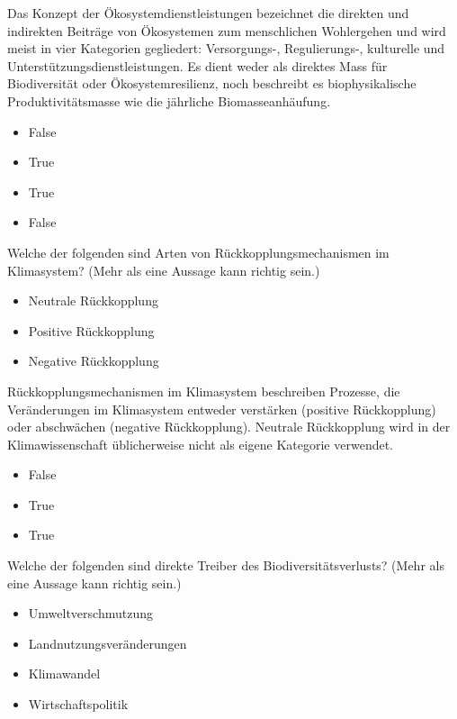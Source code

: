 \documentclass[
  nswissgerman,
  a4paper,
  DIV=11,
  numbers=noendperiod,
  oneside,
  openany]{scrreprt}
\providecommand{\tightlist}{%
  \setlength{\itemsep}{0pt}\setlength{\parskip}{0pt}}
\begin{document}
Das Konzept der Ökosystemdienstleistungen bezeichnet die direkten und
indirekten Beiträge von Ökosystemen zum menschlichen Wohlergehen und
wird meist in vier Kategorien gegliedert: Versorgungs-, Regulierungs-,
kulturelle und Unterstützungsdienstleistungen. Es dient weder als
direktes Mass für Biodiversität oder Ökosystemresilienz, noch beschreibt
es biophysikalische Produktivitätsmasse wie die jährliche
Biomasseanhäufung.

\begin{itemize}
\tightlist
\item
  False
\item
  True
\item
  True
\item
  False
\end{itemize}

Welche der folgenden sind Arten von Rückkopplungsmechanismen im
Klimasystem? (Mehr als eine Aussage kann richtig sein.)

\begin{itemize}
\tightlist
\item[$\square$]
  Neutrale Rückkopplung
\item[$\square$]
  Positive Rückkopplung
\item[$\square$]
  Negative Rückkopplung
\end{itemize}

Rückkopplungsmechanismen im Klimasystem beschreiben Prozesse, die
Veränderungen im Klimasystem entweder verstärken (positive Rückkopplung)
oder abschwächen (negative Rückkopplung). Neutrale Rückkopplung wird in
der Klimawissenschaft üblicherweise nicht als eigene Kategorie
verwendet.

\begin{itemize}
\tightlist
\item
  False
\item
  True
\item
  True
\end{itemize}

Welche der folgenden sind direkte Treiber des Biodiversitätsverlusts?
(Mehr als eine Aussage kann richtig sein.)

\begin{itemize}
\tightlist
\item[$\square$]
  Umweltverschmutzung
\item[$\square$]
  Landnutzungsveränderungen
\item[$\square$]
  Klimawandel
\item[$\square$]
  Wirtschaftspolitik
\end{itemize}
\end{document}
